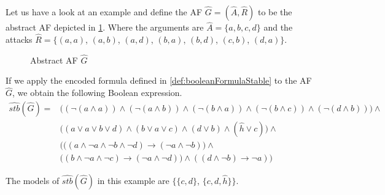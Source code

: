 \begin{example}
    Let us have a look at an example and define the AF $\hat{G}=(\hat{A}, \hat{R})$ to be the abstract AF depicted in \cref{af:algorithmEncodingsStable}. Where the arguments are $\hat{A}=\{a, b, c, d\}$ and the attacks $\hat{R}=\big\{ (a,a)$, $(a,b)$, $(a,d)$, $(b,a)$, $(b,d)$, $(c,b)$, $(d,a)\big\}$.

    \begin{figure}[H]
        \centering
        \caption{Abstract AF $\hat{G}$}
        \label{af:algorithmEncodingsStable}
    \end{figure}

If we apply the encoded formula defined in \cref{def:booleanFormulaStable} to the AF $\hat{G}$, we obtain the following Boolean expression.
\begin{align*}
    \hat{stb}(\hat{G}) = &\bigl( (\lnot (a \land a)) \land (\lnot (a \land b)) 
    \land (\lnot (b \land a)) \land (\lnot (b \land c)) \land (\lnot (d \land b)) \bigl) \land\\
    & \bigl( (a \lor a \lor b \lor d) \land (b \lor a \lor c) \land (d \lor b) \land (\hat{h} \lor c)\bigl) \land \\
    & \bigl( ((a \land \lnot a \land \lnot b \land \lnot d) \rightarrow (\lnot a \land \lnot b)\bigl) \land\\
    & \bigl((b \land \lnot a \land \lnot c) \rightarrow (\lnot a \land \lnot d)) \land ((d \land \lnot b) \rightarrow \lnot a)\bigl)
\end{align*}


The models of $\hat{stb}(\hat{G})$ in this example are $\bigl\{$$\{c, d\}$, $\{c, d, \hat{h}\} \bigl\}$.
\end{example}

